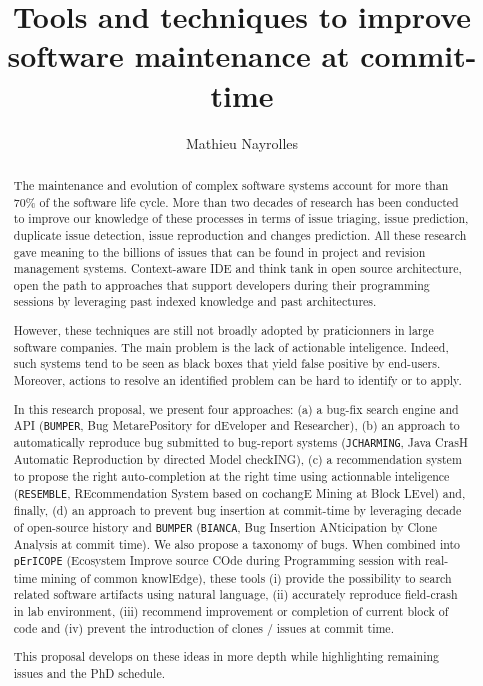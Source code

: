 \documentclass[11pt,a4paper, cuthesis]{report}
\author{Mathieu Nayrolles}
\title{Tools and techniques to improve software maintenance at commit-time}
\begin{document}
\begin{abstract}

  The maintenance and evolution of complex software systems account for more than 70\% of the software life cycle.
  More than two decades of research has been conducted to improve our knowledge of these processes in terms of issue triaging, issue prediction, duplicate issue detection, issue reproduction and changes prediction.
  All these research gave meaning to the billions of issues that can be found in project and revision management systems.
  Context-aware IDE and think tank in open source architecture, open the path to approaches that support developers during their programming sessions by leveraging past indexed knowledge and past architectures.

  However, these techniques are still not broadly adopted by praticionners in large software companies.
  The main problem is the lack of actionable inteligence.
  Indeed, such systems tend to be seen as black boxes that yield false positive by end-users.
  Moreover, actions to resolve an identified problem can be hard to identify or to apply.

  In this research proposal, we present four approaches: (a) a bug-fix search engine and API ({\tt BUMPER}, Bug MetarePository for dEveloper and Researcher), (b) an approach to automatically reproduce bug submitted to bug-report systems ({\tt JCHARMING}, Java CrasH Automatic Reproduction by directed Model checkING), (c) a recommendation system to propose the right auto-completion at the right time using actionnable inteligence ({\tt RESEMBLE}, REcommendation System based on cochangE Mining at Block LEvel) and, finally, (d) an approach to prevent bug insertion at commit-time by leveraging decade of open-source history and {\tt BUMPER} ({\tt BIANCA}, Bug Insertion ANticipation by Clone Analysis at commit time).
  We also propose a taxonomy of bugs.
  When combined into {\tt pErICOPE} (Ecosystem Improve source COde during Programming session with real-time mining of common knowlEdge), these tools (i) provide the possibility to search related software artifacts using natural language, (ii) accurately reproduce field-crash in lab environment, (iii) recommend improvement or completion of current block of code and (iv) prevent the introduction of clones / issues at commit time.

  This proposal develops on these ideas in more depth while highlighting remaining issues and the PhD schedule.
\end{abstract}

\tableofcontents
\listoffigures
\listoftables










\end{document}
